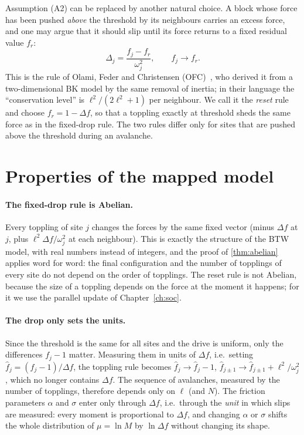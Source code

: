 Assumption (A2) can be replaced by another natural choice. A block whose force has been pushed \emph{above} the threshold by its neighbours
carries an excess force, and one may argue that it should slip until its force returns to a fixed residual value $f_r$:
\begin{equation}
  \Delta_j = \frac{f_j - f_r}{\omega_j^2},\qquad f_j\to f_r .
\end{equation}
This is the rule of Olami, Feder and Christensen (OFC)~\cite{OFC1992}, who derived it from a two-dimensional BK model by the same removal of
inertia; in their language the ``conservation level'' is $\ell^2/(2\ell^2+1)$ per neighbour. We call it the \emph{reset} rule and choose
$f_r = 1-\Delta f$, so that a toppling exactly at threshold sheds the same force as in the fixed-drop rule. The two rules differ only for
sites that are pushed above the threshold during an avalanche.

\section{Properties of the mapped model}
\label{sec:map-properties}

\paragraph{The fixed-drop rule is Abelian.} Every toppling of site $j$ changes the forces by the same fixed vector (minus $\Delta f$ at $j$, plus
$\ell^2\Delta f/\omega_j^2$ at each neighbour). This is exactly the structure of the BTW model, with real numbers instead of integers, and the
proof of \cref{thm:abelian} applies word for word: the final configuration and the number of topplings of every site do not depend on the order of
topplings. The reset rule is not Abelian, because the size of a toppling depends on the force at the moment it happens; for it we use the parallel
update of Chapter~\ref{ch:soc}.

\paragraph{The drop only sets the units.} Since the threshold is the same for all sites and the drive is uniform, only the differences $f_j - 1$
matter. Measuring them in units of $\Delta f$, i.e.\ setting $\hat f_j = (f_j-1)/\Delta f$, the toppling rule becomes $\hat f_j\to\hat f_j-1$,
$\hat f_{j\pm1}\to\hat f_{j\pm1}+\ell^2/\omega_j^2$, which no longer contains $\Delta f$. The sequence of avalanches, measured by the number of
topplings, therefore depends only on $\ell$ (and $N$). The friction parameters $\alpha$ and $\sigma$ enter only through $\Delta f$, i.e.\ through the
\emph{unit} in which slips are measured: every moment is proportional to $\Delta f$, and changing $\alpha$ or $\sigma$ shifts the whole distribution
of $\mu = \ln M$ by $\ln\Delta f$ without changing its shape.

